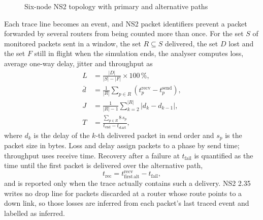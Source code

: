 \documentclass[12pt,a4paper]{report}
\numberwithin{equation}{chapter}
\begin{document}
\begin{figure}[H]
\centering
{}
\caption{Six-node NS2 topology with primary and alternative paths}
\label{fig:topology}
\end{figure}

Each trace line becomes an event, and NS2 packet identifiers prevent a packet forwarded by several routers from being counted more than once. For the set $S$ of monitored packets sent in a window, the set $R\subseteq S$ delivered, the set $D$ lost and the set $F$ still in flight when the simulation ends, the analyser computes loss, average one-way delay, jitter and throughput as
\begin{align}
L &= \frac{|D|}{|S| - |F|} \times 100\,\%, \label{eq:loss}\\
\bar d &= \frac{1}{|R|}\sum_{p\in R}\left(t^{\mathrm{recv}}_p - t^{\mathrm{send}}_p\right), \label{eq:delay}\\
J &= \frac{1}{|R|-1}\sum_{k=2}^{|R|}\left|d_k - d_{k-1}\right|, \label{eq:jitter}\\
T &= \frac{\sum_{p\in R} 8\,s_p}{t_{\mathrm{end}} - t_{\mathrm{start}}}, \label{eq:throughput}
\end{align}
where $d_k$ is the delay of the $k$-th delivered packet in send order and $s_p$ is the packet size in bytes. Loss and delay assign packets to a phase by send time; throughput uses receive time. Recovery after a failure at $t_{\mathrm{fail}}$ is quantified as the time until the first packet is delivered over the alternative path,
\begin{equation}
t_{\mathrm{rec}} = t^{\mathrm{recv}}_{\mathrm{first\,alt}} - t_{\mathrm{fail}},
\label{eq:recovery}
\end{equation}
and is reported only when the trace actually contains such a delivery. NS2 2.35 writes no drop line for packets discarded at a router whose route points to a down link, so those losses are inferred from each packet's last traced event and labelled as inferred.
\end{document}
